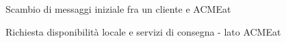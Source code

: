 \documentclass[11pt]{article} %
\begin{document}
\begin{figure}[H]
\centering
{}
\caption{Scambio di messaggi iniziale fra un cliente e ACMEat}
\end{figure}

\begin{figure}[H]
\centering
{}
\caption{Richiesta disponibilità locale e servizi di consegna - lato ACMEat}
\end{figure}
\end{document}
